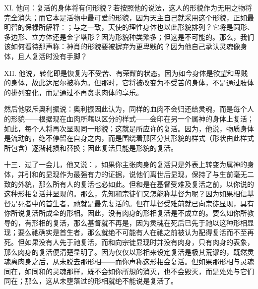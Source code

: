 XI. 他问：复活的身体将有何形貌？若按照他的说法，这人的形貌作为无用之物将完全消失；而它本是活物中最可爱的形貌，因为天主自己就采用这个形貌，正如最明智的保禄所解释：；与之一致，天使的理性身体也以此形貌排列？它将是圆形、多边形、立方体还是金字塔形？因为形貌种类繁多；但这是不可能的。那么，我们该如何看待那声称：神肖的形貌要被摒弃为更卑贱的？因为他自己承认灵魂像身体，且人复活时没有手脚？\par

XII. 他说，转化即是恢复为不受苦、有荣耀的状态。因为如今身体是欲望和卑贱的身体，故此达尼尔被称为。但那时，它将被改变为不受苦的身体，不是通过肢体的排列变化，而是通过不再贪求肉体的享乐。\par

然后他驳斥奥利振说：奥利振因此认为，同样的血肉不会归还给灵魂，而是每个人的形貌——根据现在血肉所藉以区分的样式——会印在另一个属神的身体上复活；如此，每个人将再次显现同一形貌；这就是所应许的复活。因为，他说，物质身体是流动的，绝不停留在自身之内，而是围绕着那区分其形貌的样式（形状由此样式所包含）逐渐耗损和替换；因此复活只能是形貌的复活。\par

十三．过了一会儿，他又说：，如果你主张肉身的复活只是外表上转变为属神的身体，并引和的显现作为最强有力的证据，说他们离世后显现，保持了与生前毫无二致的外貌，那么所有人的复活也必如此。但和是在基督受难及复活之前，以你说的这种形相复活并显现的。那么，先知和宗徒们又怎能称基督为呢？因为如果相信基督是死者中的首生者，祂就是最先复活的。但在基督受难前就已向宗徒显现，具有你所说复活所成全的形相。因此，没有肉身的形相复活是不成立的。要么如你所教导的，有形相的复活，那么基督就不再是，因为灵魂在死后已先于祂以这种形相显现；要么祂确实是首生者，那么就绝不可能有人在祂之前被认为配得复活而不至再死。但如果没有人先于祂复活，而和向宗徒显现时并没有肉身，只有肉身的表象，那么肉身的复活便清楚显明了。因为仅仅以形相来设定复活是极其荒谬的，既然灵魂离肉身之后，从未脱去那形相——而你声称这形相会复活。但如果那形相与灵魂同在，如同和的灵魂那样，既不会如你所想的消灭，也不会毁灭，而是处处与它们同在；那么，这从未堕落过的形相就绝不能说是复活了。\par

